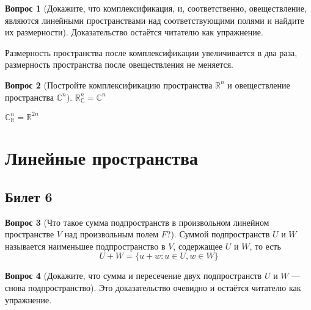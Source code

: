 \documentclass[a4paper,11pt]{article}
\theoremstyle{remark}
\theoremstyle{definition}
\newtheorem{question}{Вопрос}
\numberwithin{question}{subsection}
\begin{document}
\begin{question}[Докажите, что комплексификация, и, соответственно, овеществление, являются линейными пространствами над соответствующими полями и найдите их размерности]
Доказательство остаётся читателю как упражнение.

Размерность пространства после комплексификации увеличивается в два раза, размерность пространства после овеществления не меняется.
\end{question}


\begin{question}[Постройте комплексификацию пространства \(\mathbb{R}^n\) и овеществление пространства \(\mathbb{C}^n\)]
\(\mathbb{R}^n_{\mathbb{C}} = \mathbb{C}^n\)

\(\mathbb{C}^n_{\mathbb{R}} = \mathbb{R}^{2n}\)
\end{question}


\section{Линейные пространства}
\subsection{Билет 6}
\begin{question}[Что такое сумма подпространств в произвольном линейном пространстве \(V\) над произвольным полем \(F\)?]
Суммой подпространств \(U\) и \(W\) называется наименьшее подпространство в \(V\), содержащее \(U\) и \(W\), то есть 
\begin{equation*}
	U + W = \{u + w: u \in U, w \in W\}
\end{equation*}
\end{question}


\begin{question}[Докажите, что сумма и пересечение двух подпространств \(U\) и \(W\) --- снова подпространство]
Это доказательство очевидно и остаётся читателю как упражнение.
\end{question}
\end{document}
